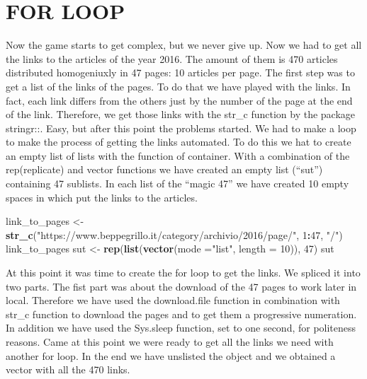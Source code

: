 \documentclass[
]{article}
\newenvironment{Shaded}{\begin{snugshade}}{\end{snugshade}}
\newcommand{\DataTypeTok}[1]{\textcolor[rgb]{0.13,0.29,0.53}{#1}}
\newcommand{\DecValTok}[1]{\textcolor[rgb]{0.00,0.00,0.81}{#1}}
\newcommand{\KeywordTok}[1]{\textcolor[rgb]{0.13,0.29,0.53}{\textbf{#1}}}
\newcommand{\NormalTok}[1]{#1}
\newcommand{\OperatorTok}[1]{\textcolor[rgb]{0.81,0.36,0.00}{\textbf{#1}}}
\newcommand{\StringTok}[1]{\textcolor[rgb]{0.31,0.60,0.02}{#1}}
\begin{document}
\hypertarget{for-loop}{%
\section{FOR LOOP}\label{for-loop}}

Now the game starts to get complex, but we never give up. Now we had to
get all the links to the articles of the year 2016. The amount of them
is 470 articles distributed homogeniuxly in 47 pages: 10 articles per
page. The first step was to get a list of the links of the pages. To do
that we have played with the links. In fact, each link differs from the
others just by the number of the page at the end of the link. Therefore,
we get those links with the str\_c function by the package stringr::.
Easy, but after this point the problems started. We had to make a loop
to make the process of getting the links automated. To do this we hat to
create an empty list of lists with the function of container. With a
combination of the rep(replicate) and vector functions we have created
an empty list (``sut'') containing 47 sublists. In each list of the
``magic 47'' we have created 10 empty spaces in which put the links to
the articles.

\begin{Shaded}
\begin{Highlighting}[]
\NormalTok{link_to_pages <-}\StringTok{ }\KeywordTok{str_c}\NormalTok{(}\StringTok{"https://www.beppegrillo.it/category/archivio/2016/page/"}\NormalTok{, }
                       \DecValTok{1}\OperatorTok{:}\DecValTok{47}\NormalTok{, }\StringTok{"/"}\NormalTok{)}
\NormalTok{link_to_pages}
\NormalTok{sut <-}\StringTok{  }\KeywordTok{rep}\NormalTok{(}\KeywordTok{list}\NormalTok{(}\KeywordTok{vector}\NormalTok{(}\DataTypeTok{mode =}\StringTok{"list"}\NormalTok{, }\DataTypeTok{length =} \DecValTok{10}\NormalTok{)), }\DecValTok{47}\NormalTok{)}
\NormalTok{sut}
\end{Highlighting}
\end{Shaded}

At this point it was time to create the for loop to get the links. We
spliced it into two parts. The fist part was about the download of the
47 pages to work later in local. Therefore we have used the
download.file function in combination with str\_c function to download
the pages and to get them a progressive numeration. In addition we have
used the Sys.sleep function, set to one second, for politeness reasons.
Came at this point we were ready to get all the links we need with
another for loop. In the end we have unslisted the object and we
obtained a vector with all the 470 links.
\end{document}
